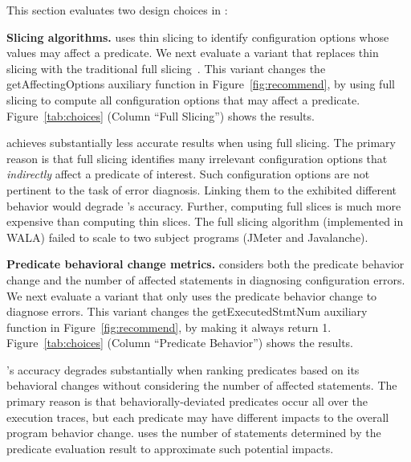 This section evaluates two design choices in \ourtool:

\noindent \textbf{{Slicing algorithms.}} \ourtool
uses thin slicing to identify configuration options
whose values may affect a predicate. We next evaluate
a variant that replaces thin slicing with
the traditional full slicing~\cite{Horwitz:1988}.
This variant changes the getAffectingOptions
auxiliary function in Figure~\ref{fig:recommend}, by using full slicing to compute all
configuration options that may affect a predicate.
Figure~\ref{tab:choices} (Column ``Full Slicing'') shows the results.


\ourtool achieves substantially less accurate results when
using full slicing. The primary reason is that full slicing
identifies many irrelevant configuration options that \textit{indirectly}
affect a predicate of interest. Such configuration options
are not pertinent to the task of error diagnosis. Linking them
to the exhibited different behavior would degrade
\ourtool's accuracy. Further, computing full slices is much
more expensive than computing thin slices. 
The full slicing algorithm (implemented in WALA) failed to scale
to two subject programs (JMeter and Javalanche).

\vspace{1mm}

\noindent \textbf{Predicate behavioral change metrics.}
\ourtool considers both the predicate behavior change
and the number of affected statements in diagnosing
configuration errors. We next evaluate a variant
that only uses the predicate behavior change to diagnose errors.
This variant 
changes the getExecutedStmtNum auxiliary function in
Figure~\ref{fig:recommend}, by making it always return 1.
Figure~\ref{tab:choices} (Column ``Predicate Behavior'') shows
the results. 



\ourtool's accuracy degrades substantially when ranking
predicates based on its behavioral changes without considering
the number of affected statements.
The primary reason is that behaviorally-deviated predicates occur all over the execution traces,
but each predicate
may have different impacts to the overall program behavior change.
\ourtool uses the number of statements determined by the predicate
evaluation result to approximate such potential impacts.


